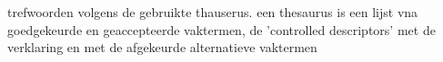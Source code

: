 
trefwoorden
volgens de gebruikte thauserus. een thesaurus is een lijst vna goedgekeurde en geaccepteerde vaktermen, de 'controlled descriptors' met de verklaring en met de afgekeurde alternatieve vaktermen